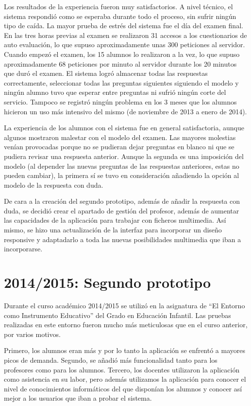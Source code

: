 Los resultados de la experiencia fueron muy satisfactorios. A nivel técnico, el sistema respondió como se esperaba durante todo el proceso, sin sufrir ningún tipo de caída. La mayor prueba de estrés del sistema fue el día del examen final. En las tres horas previas al examen se realizaron 31 accesos a los cuestionarios de auto evaluación, lo que supuso aproximadamente unas 300 peticiones al servidor. Cuando empezó el examen, los 15 alumnos lo realizaron a la vez, lo que supuso aproximadamente 68 peticiones por minuto al servidor durante los 20 minutos que duró el examen. El sistema logró almacenar todas las respuestas correctamente, seleccionar todas las preguntas siguientes siguiendo el modelo y ningún alumno tuvo que esperar entre preguntas ni sufrió ningún corte del servicio. Tampoco se registró ningún problema en los 3 meses que los alumnos hicieron un uso más intensivo del mismo (de noviembre de 2013 a enero de 2014).

La experiencia de los alumnos con el sistema fue en general satisfactoria, aunque algunos mostraron malestar con el modelo del examen. Las mayores molestias venían provocadas porque no se pudieran dejar preguntas en blanco ni que se pudiera revisar una respuesta anterior. Aunque la segunda es una imposición del modelo (al depender las nuevas preguntas de las respuestas anteriores, estas no pueden cambiar), la primera sí se tuvo en consideración añadiendo la opción al modelo de la respuesta con duda.

De cara a la creación del segundo prototipo, además de añadir la respuesta con duda, se decidió crear el apartado de gestión del profesor, además de aumentar las capacidades de la aplicación para trabajar con ficheros multimedia. Así mismo, se hizo una actualización de la interfaz para incorporar un diseño responsive y adaptadarlo a toda las nuevas posibilidades multimedia que iban a incorporarse.

\section{2014/2015: Segundo prototipo}

Durante el curso académico 2014/2015 se utilizó en la asignatura de ``El Entorno como Instrumento Educativo'' del Grado en Educación Infantil. Las pruebas realizadas en este entorno fueron mucho más meticulosas que en el curso anterior, por varios motivos. 

Primero, los alumnos eran más y por lo tanto la aplicación se enfrentó a mayores picos de demanda. Segundo, se añadió más funcionalidad tanto para los profesores como para los alumnos. Tercero, los docentes utilizaron la aplicación como asistencia en su labor, pero además utilizamos la aplicación para conocer el nivel de conocimientos informáticos del que disponían los alumnos y conocer así mejor a los usuarios que iban a probar el sistema.

